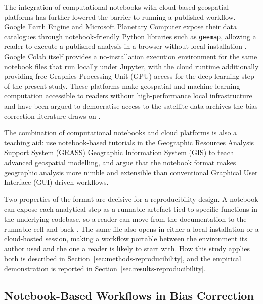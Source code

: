 The integration of computational notebooks with cloud-based
geospatial platforms has further lowered the barrier to running
a published workflow. Google Earth Engine and Microsoft
Planetary Computer expose their data catalogues through
notebook-friendly Python libraries such as \texttt{geemap},
allowing a reader to execute a published analysis in a browser
without local installation \cite{ref:gorelick2017, ref:wu2020}. Google Colab itself
provides a no-installation execution environment for the same
notebook files that run locally under Jupyter, with the cloud
runtime additionally providing free Graphics Processing Unit (GPU)
access for the deep learning step of the present study. These platforms make
geospatial and machine-learning computation accessible to
readers without high-performance local infrastructure and have
been argued to democratise access to the satellite data
archives the bias correction literature draws on
\citep{ref:yin2019, ref:gentemann2021}.

The combination of
computational notebooks and cloud platforms is also a teaching
aid: \citet{ref:haedrich2023} use notebook-based tutorials in the
Geographic Resources Analysis Support System (GRASS) Geographic
Information System (GIS) to teach advanced geospatial modelling,
and \citet{ref:boeing2021} argue that the notebook format makes
geographic analysis more nimble and extensible than conventional
Graphical User Interface (GUI)-driven workflows.

Two properties of the format are decisive for a reproducibility
design. A notebook can expose each analytical step as a runnable
artefact tied to specific functions in the underlying codebase, so
a reader can move from the documentation to the runnable cell and
back \cite{ref:perkel2018, ref:granger2021, ref:beg2021}. The same
file also opens in either a local installation or a cloud-hosted
session, making a workflow portable between the environment its
author used and the one a reader is likely to start with. How this
study applies both is described in
Section~\ref{sec:methods-reproducibility}, and the empirical
demonstration is reported in
Section~\ref{sec:results-reproducibility}.

\subsection{Notebook-Based Workflows in Bias Correction}


